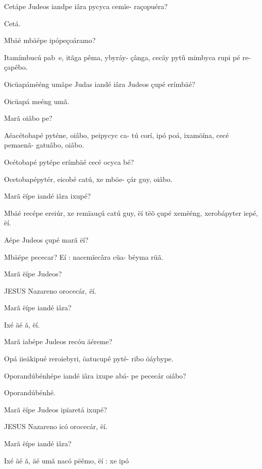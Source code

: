 \documentclass[openany,titlepage,12pt]{book}
\begin{document}
\begin{alternate}
    \item Cetápe Judeos iandpe iâra pycyca cemïe-
    raçopuéra?
    \item Cetá.
    \item Mbäé mbäépe ipópeçoáramo?
    \item Itamímbucú pab~e, itãga pêma, ybyráy-
    çânga, cecäy pyt\~u mimbyca rupi pé re-\linebreak
    çapêbo.
    \item Oicüapámëéng umãpe Judas iandé iâra
    Judeos çupé erímbäé?
    \item Oicüapá meéng umã.
    \item Marã oiâbo pe?
    \item Aéacétobapé pyténe, oiâbo, peipycyc ca-
    tú corí, ipó poá, ixamöína, cecé pemaenã-
    gatuâbo, oiâbo.
    \item Océtobapé pytépe erímbäé cecé ocyca\linebreak
    bé?
    \item Ocetobapépytér, eicobé catú, xe mböe-
    çár guy, oiâbo.
    \item Marã ëípe iandé iâra ixupé?
    \item Mbäé recépe ereiúr, xe remïauçú catú\linebreak
    guy, ëí tëõ çupé xemëéng, xerobápyter\linebreak
    iepé, ëí.
    \item Aépe Judeos çupé marã ëí?
    \item Mbäépe pececar? Eí : nacemïecâra cüa-
    bëyma rüã.
    \item Marã ëípe Judeos?
    \item JESUS Nazareno orocecár, ëí.
    \item Marã ëípe iandé iâra?
    \item Ixé äé ã, ëí.
    \item Marã iabépe Judeos recóu äéreme?
    \item Opá iieäkipué reroiebyri, öatucupê pyté-
    ribo öáybype.
    \item Oporandúbénhépe iandé iâra ixupe abá-
    pe pececár oiâbo?
    \item Oporandúbénhé.
    \item Marã ëípe Judeos ipïaretá ixupé?
    \item JESUS Nazareno icó orocecár, ëí.
    \item Marã ëípe iandé iâra?
    \item Ixé äé ã, äé umã nacó pëêmo, ëí : xe ipó

\end{alternate}
\end{document}
